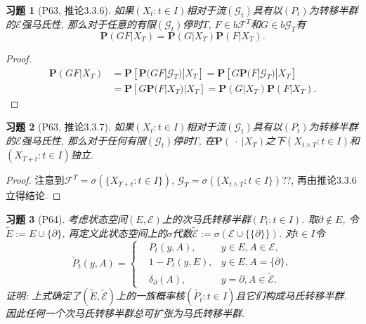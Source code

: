 \documentclass[UTF8,ondside]{ctexart}
\newtheorem{exercise}{习题}[section]
\newcommand{\h}{\mathscr}
\newcommand{\mbf}{\mathbf}
\numberwithin{equation}{section}
\begin{document}
	\begin{exercise}[P63, 推论3.3.6]
		如果$(X_t:t\in I)$相对于流$(\h G_t)$具有以$(P_t)$为转移半群的$\h E$强马氏性, 那么对于任意的有限$(\h G_t)$停时$T$, $F\in b\h F^{T}$和$G\in b\h G_T$有
		\[
			\mbf P(GF|X_T)=\mbf P(G|X_T)\mbf P(F|X_T).
		\]
	\end{exercise}
	\begin{proof}
		\[
			\begin{aligned}
				\mbf P(GF|X_T)
				&=\mbf P[\mbf P(GF|\h G_T)|X_T]=\mbf P[G\mbf P(F|\h G_T)|X_T]\\
				&=\mbf P[G\mbf P(F|X_T)|X_T]=\mbf P(G|X_T)\mbf P(F|X_T).
			\end{aligned}
		\]
	\end{proof}
	\begin{exercise}[P63, 推论3.3.7]
		如果$(X_t:t\in I)$相对于流$(\h G_t)$具有以$(P_t)$为转移半群的$\h E$强马氏性, 那么对于任何有限$(\h G_t)$停时$T$, 在$\mbf P(\ \cdot\ |X_T)$之下$(X_{t\land T}:t\in I)$和$(X_{T+t}:t\in I)$独立.
	\end{exercise}
	\begin{proof}
		注意到$\h F^T=\sigma(\{X_{T+t}:t\in I\})$, $\h G_T=\sigma(\{X_{t\land T}:t\in I\})$??, 再由推论3.3.6立得结论.
	\end{proof}
	\begin{exercise}[P64]
		考虑状态空间$(E,\h E)$上的次马氏转移半群$(P_t:t\in I)$. 取$\partial \notin E$, 令$\tilde{E}:=E\cup \{\partial\}$, 再定义此状态空间上的$\sigma$代数$\tilde{\h E}:=\sigma(\h E\cup \{\{\partial\}\})$. 对$t\in I$令
		\[
			\tilde P_t(y,A)=\left\{
				\begin{aligned}
					&P_t(y,A), &y\in E,A\in\h E,\\
					&1-P_t(y,E),& y\in E,A = \{\partial\},\\
					&\delta_\partial(A), &y=\partial,A\in\tilde{\h E}.
				\end{aligned}
			\right.
		\]
		证明: 上式确定了$(\tilde{E},\tilde{\h E})$上的一族概率核$(\tilde{P_t}:t\in I)$且它们构成马氏转移半群. 因此任何一个次马氏转移半群总可扩张为马氏转移半群.
	\end{exercise}
\end{document}
